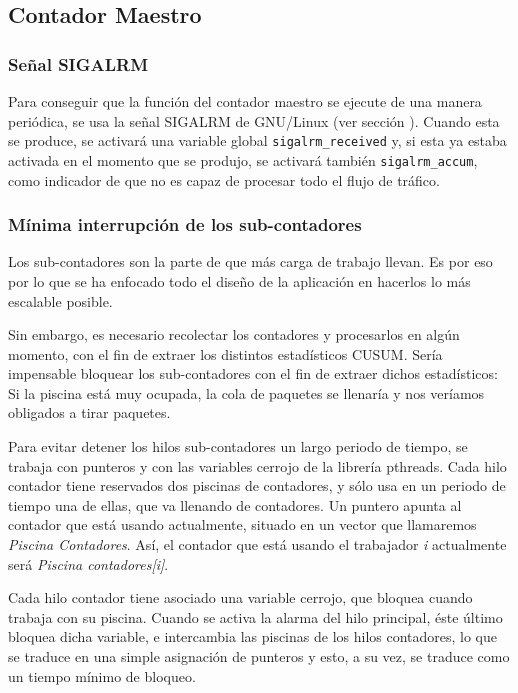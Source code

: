 \subsection{Contador Maestro}
\subsubsection{Señal SIGALRM}
Para conseguir que la función del contador maestro se ejecute de una manera periódica, se usa la señal 
SIGALRM de GNU/Linux (ver sección ). Cuando esta se produce, 
se activará una variable global \texttt{sigalrm\_received} y, si esta ya estaba activada en el momento que se produjo, 
se activará también \texttt{sigalrm\_accum}, como indicador de que \redborderddos{} no es capaz de procesar todo el 
flujo de tráfico.

\subsubsection{Mínima interrupción de los sub-contadores}
Los sub-contadores son la parte de \redborderddos que más carga de trabajo llevan. Es por eso por lo que se ha enfocado 
todo el diseño de la aplicación en hacerlos lo más escalable posible.

Sin embargo, es necesario recolectar los contadores y procesarlos en algún momento, con el fin de extraer los distintos 
estadísticos \gls{CUSUM}. Sería impensable bloquear los sub-contadores con el fin de extraer dichos estadísticos: Si la 
piscina está muy ocupada, la cola de paquetes se llenaría y nos veríamos obligados a tirar paquetes.

Para evitar detener los hilos sub-contadores un largo periodo de tiempo, se trabaja con punteros y con las variables 
cerrojo de la librería \gls{pthreads}. Cada hilo contador tiene reservados dos piscinas de 
contadores, y sólo usa en un periodo de tiempo una de ellas, que va llenando de contadores. Un puntero apunta al 
contador que está usando actualmente, situado en un vector que llamaremos \emph{Piscina Contadores}. Así, el contador 
que está usando el trabajador \emph{i} actualmente será \emph{Piscina contadores[i]}.

Cada hilo contador tiene asociado una variable cerrojo, que bloquea cuando trabaja con su 
piscina. Cuando se activa la alarma del hilo principal, éste último bloquea dicha variable, e intercambia las piscinas 
de los hilos contadores, lo que se traduce en una simple asignación de punteros y esto, a su vez, se traduce como un 
tiempo mínimo de bloqueo.

